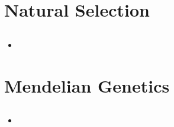 \documentclass[12pt,a4paper]{article}
\begin{document}
\clearpage
\setcounter{section}{2}
\section{Natural Selection}
\subsection{}
\begin{itemize}
    \item 
\end{itemize}

\clearpage
{}
\clearpage
\setcounter{section}{5}
\section{Mendelian Genetics}
\subsection{}
\begin{itemize}
    \item 
\end{itemize}
\end{document}
